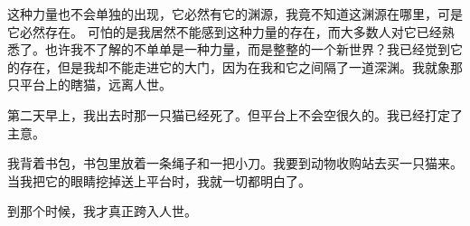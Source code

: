 这种力量也不会单独的出现，它必然有它的渊源，我竟不知道这渊源在哪里，可是它必然存在。 可怕的是我居然不能感到这种力量的存在，而大多数人对它已经熟悉了。也许我不了解的不单单是一种力量，而是整整的一个新世界？我已经觉到它的存在，但是我却不能走进它的大门，因为在我和它之间隔了一道深渊。我就象那只平台上的瞎猫，远离人世。 

第二天早上，我出去时那一只猫已经死了。但平台上不会空很久的。我已经打定了主意。 

我背着书包，书包里放着一条绳子和一把小刀。我要到动物收购站去买一只猫来。当我把它的眼睛挖掉送上平台时，我就一切都明白了。 

到那个时候，我才真正跨入人世。

